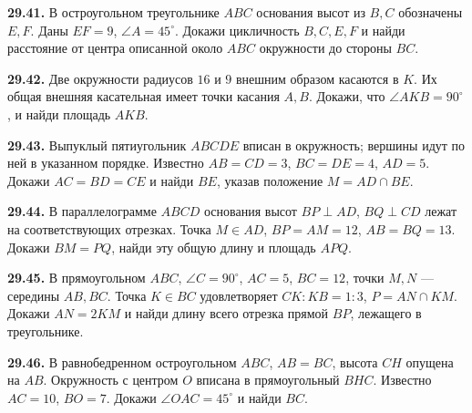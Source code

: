 \noindent\begin{minipage}[t]{\linewidth}\textbf{29.41.}\starmark{} В остроугольном треугольнике \(ABC\) основания высот из \(B,C\) обозначены \(E,F\). Даны \(EF=9\), \(\angle A=45^\circ\). Докажи цикличность \(B,C,E,F\) и найди расстояние от центра описанной около \(ABC\) окружности до стороны \(BC\).\par\end{minipage}\par
\noindent\begin{minipage}[t]{\linewidth}\textbf{29.42.}\starmark{} Две окружности радиусов \(16\) и \(9\) внешним образом касаются в \(K\). Их общая внешняя касательная имеет точки касания \(A,B\). Докажи, что \(\angle AKB=90^\circ\), и найди площадь \(AKB\).\par\end{minipage}\par
\noindent\begin{minipage}[t]{\linewidth}\textbf{29.43.}\starmark{} Выпуклый пятиугольник \(ABCDE\) вписан в окружность; вершины идут по ней в указанном порядке. Известно \(AB=CD=3\), \(BC=DE=4\), \(AD=5\). Докажи \(AC=BD=CE\) и найди \(BE\), указав положение \(M=AD\cap BE\).\par\end{minipage}\par
\noindent\begin{minipage}[t]{\linewidth}\textbf{29.44.}\starmark{} В параллелограмме \(ABCD\) основания высот \(BP\perp AD\), \(BQ\perp CD\) лежат на соответствующих отрезках. Точка \(M\in AD\), \(BP=AM=12\), \(AB=BQ=13\). Докажи \(BM=PQ\), найди эту общую длину и площадь \(APQ\).\par\end{minipage}\par
\noindent\begin{minipage}[t]{\linewidth}\textbf{29.45.}\starmark{} В прямоугольном \(ABC\), \(\angle C=90^\circ\), \(AC=5\), \(BC=12\), точки \(M,N\) --- середины \(AB,BC\). Точка \(K\in BC\) удовлетворяет \(CK:KB=1:3\), \(P=AN\cap KM\). Докажи \(AN=2KM\) и найди длину всего отрезка прямой \(BP\), лежащего в треугольнике.\par\end{minipage}\par
\noindent\begin{minipage}[t]{\linewidth}\textbf{29.46.}\starmark{} В равнобедренном остроугольном \(ABC\), \(AB=BC\), высота \(CH\) опущена на \(AB\). Окружность с центром \(O\) вписана в прямоугольный \(BHC\). Известно \(AC=10\), \(BO=7\). Докажи \(\angle OAC=45^\circ\) и найди \(BC\).\par\end{minipage}\par
\endgroup
